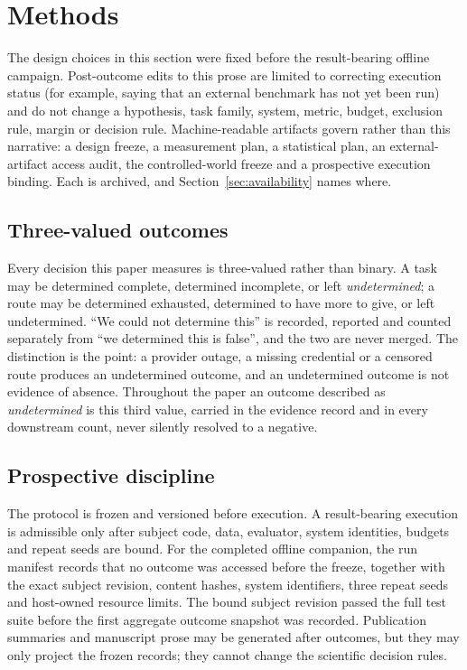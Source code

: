 \section{Methods}
\label{sec:methods}

The design choices in this section were fixed before the result-bearing offline
campaign.  Post-outcome edits to this prose are limited to correcting execution
status (for example, saying that an external benchmark has not yet been run) and
do not change a hypothesis, task family, system, metric, budget, exclusion rule,
margin or decision rule.  Machine-readable artifacts govern rather than this
narrative: a design freeze, a measurement plan, a statistical plan, an
external-artifact access audit, the controlled-world freeze and a prospective
execution binding.  Each is archived, and Section~\ref{sec:availability} names
where.

\subsection{Three-valued outcomes}
Every decision this paper measures is three-valued rather than binary.  A task
may be determined complete, determined incomplete, or left \emph{undetermined};
a route may be determined exhausted, determined to have more to give, or left
undetermined.  ``We could not determine this'' is recorded, reported and counted
separately from ``we determined this is false'', and the two are never merged.
The distinction is the point: a provider outage, a missing credential or a
censored route produces an undetermined outcome, and an undetermined outcome is
not evidence of absence.  Throughout the paper an outcome described as
\emph{undetermined} is this third value, carried in the evidence record and in
every downstream count, never silently resolved to a negative.

\subsection{Prospective discipline}
The protocol is frozen and versioned before execution.  A result-bearing
execution is admissible only after subject code, data, evaluator, system
identities, budgets and repeat seeds are bound.  For the completed offline
companion, the run manifest records that no outcome was accessed before the
freeze, together with the exact subject revision, content hashes,
\OfflineSystemCount{} system identifiers, three repeat seeds and host-owned
resource limits.  The bound subject revision passed the full test suite before
the first aggregate outcome snapshot was recorded.  Publication summaries and
manuscript prose may be generated after outcomes, but they may only project the
frozen records; they cannot change the scientific decision rules.

